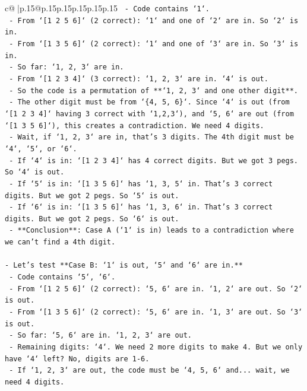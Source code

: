 \documentclass{article}
\begin{document}
{\begin{supertabular}{c@{$\;$}|p{.15\linewidth}@{}p{.15\linewidth}p{.15\linewidth}p{.15\linewidth}p{.15\linewidth}p{.15\linewidth}}
{{{\texttt{        {-} Code contains `1`.} \\
\texttt{        {-} From `{[}1 2 5 6{]}` (2 correct): `1` and one of `2` are in. So `2` is in.} \\
\texttt{        {-} From `{[}1 3 5 6{]}` (2 correct): `1` and one of `3` are in. So `3` is in.} \\
\texttt{        {-} So far: `1, 2, 3` are in.} \\
\texttt{        {-} From `{[}1 2 3 4{]}` (3 correct): `1, 2, 3` are in. `4` is out.} \\
\texttt{        {-} So the code is a permutation of **`1, 2, 3` and one other digit**.} \\
\texttt{        {-} The other digit must be from `\{4, 5, 6\}`. Since `4` is out (from `{[}1 2 3 4{]}` having 3 correct with `1,2,3`), and `5, 6` are out (from `{[}1 3 5 6{]}`), this creates a contradiction. We need 4 digits.} \\
\texttt{        {-} Wait, if `1, 2, 3` are in, that's 3 digits. The 4th digit must be `4`, `5`, or `6`.} \\
\texttt{        {-} If `4` is in: `{[}1 2 3 4{]}` has 4 correct digits. But we got 3 pegs. So `4` is out.} \\
\texttt{        {-} If `5` is in: `{[}1 3 5 6{]}` has `1, 3, 5` in. That's 3 correct digits. But we got 2 pegs. So `5` is out.} \\
\texttt{        {-} If `6` is in: `{[}1 3 5 6{]}` has `1, 3, 6` in. That's 3 correct digits. But we got 2 pegs. So `6` is out.} \\
\texttt{        {-} **Conclusion**: Case A (`1` is in) leads to a contradiction where we can't find a 4th digit.} \\
\\ 
\texttt{{-} Let's test **Case B: `1` is out, `5` and `6` are in.**} \\
\texttt{    {-} Code contains `5`, `6`.} \\
\texttt{    {-} From `{[}1 2 5 6{]}` (2 correct): `5, 6` are in. `1, 2` are out. So `2` is out.} \\
\texttt{    {-} From `{[}1 3 5 6{]}` (2 correct): `5, 6` are in. `1, 3` are out. So `3` is out.} \\
\texttt{    {-} So far: `5, 6` are in. `1, 2, 3` are out.} \\
\texttt{    {-} Remaining digits: `4`. We need 2 more digits to make 4. But we only have `4` left? No, digits are 1{-}6.} \\
\texttt{    {-} If `1, 2, 3` are out, the code must be `4, 5, 6` and... wait, we need 4 digits.} \\
}}}
\end{supertabular}}
\end{document}
